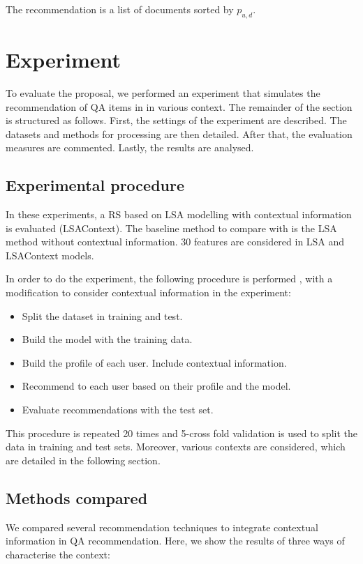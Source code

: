 \documentclass[preprint]{elsarticle}
\begin{document}
\begin{spacing}{2}
The recommendation is a list of documents sorted by $p_{u,d}$.

\section{Experiment}

To evaluate the proposal, we performed an experiment that simulates the recommendation of QA items in in various context. The remainder of the section is structured as follows. First, the settings of the experiment are described. The datasets and methods for processing are then detailed. After that, the evaluation measures are commented. Lastly, the results are analysed.

\subsection{Experimental procedure}

In these experiments, a RS based on LSA modelling with contextual information is evaluated (LSAContext). The baseline method to compare with is the LSA method without contextual information. 30 features are considered in LSA and LSAContext models.

In order to do the experiment, the following procedure is performed \cite{Sarwar2001}, with a modification to consider contextual information in the experiment:
\begin{itemize}
	\item Split the dataset in training and test.
	\item Build the model with the training data.
	\item Build the profile of each user. Include contextual information.
	\item Recommend to each user based on their profile and the model.
	\item Evaluate recommendations with the test set.
\end{itemize}

This procedure is repeated 20 times and 5-cross fold validation is used to split the data in training and test sets. Moreover, various contexts are considered, which are detailed in the following section.

\subsection{Methods compared}

We compared several recommendation techniques to integrate contextual information in QA recommendation. Here, we show the results of three ways of characterise the context:


\end{spacing}
\end{document}
